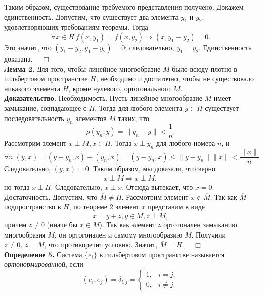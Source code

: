 \documentclass[12pt,a4paper, titlepage]{article}
\begin{document}
Таким образом, существование требуемого представления получено. Докажем единственность. Допустим, что существует два элемента $y_1$ и $y_2$, удовлетворяющих требованиям теоремы. Тогда 
$$
\forall x \in H\ f(x, y_1) = f(x, y_2) \Rightarrow (x, y_1 - y_2) = 0.
$$
Это значит, что $(y_1 - y_2, y_1 - y_2) = 0$; следовательно, $y_1 = y_2$. Единственность доказана. $\quad \Box$\\

\textbf{Лемма 2.} Для того, чтобы линейное многообразие $M$ было всюду плотно в гильбертовом пространстве $H$, необходимо и достаточно, чтобы не существовало никакого элемента $H$, кроме нулевого, ортогонального $M$.\\
\textbf{Доказательство.} Необходимость. Пусть линейное многообразие $M$ имеет замыкание, совпадающее с $H$. Тогда для любого элемента $y \in H$ существует последовательность ${y_n}$ элементов $M$ таких, что 
$$
\rho (y_n, y) = \|y_n - y\| < \frac{1}{n}.
$$
Рассмотрим элемент $x \perp M, x \in H$. Тогда $x \perp y_n$ для любого номера $n$, и
$$
\forall n \; (y, x) = (y - y_n, x) + (y_n, x) = (y - y_n, x) \leqslant \|y - y_n\|\|x\| < \frac{\|x\|}{n}. 
$$
Следовательно, $(y, x) = 0$. Таким образом, мы доказали, что верно 
$$
x \perp M \Rightarrow x \perp \overline{M},
$$
но тогда $x \perp H$. Следовательно, $x \perp x$. Отсюда вытекает, что $x = 0$.\\

Достаточность. Допустим, что $\overline{M} \neq H$. Рассмотрим элемент $x \notin \overline{M}$. Так как $\overline{M}$ --- подпространство в $H$, по теореме 2 элемент $x$ представим в виде
$$
x = y + z, y \in \overline{M}, z \perp \overline{M},
$$
причем $z \neq 0$ (иначе бы $x \in \overline{M}$). Так как элемент $z$ ортогонален замыканию многообразия $M$, он ортогонален и самому многообразию $M$. Получили $z \neq 0, \ z \perp M$, что противоречит условию. Значит, $\overline{M} = H$. $\quad \Box$\\

\textbf{Определение 5.} Система $\{e_i\}$ в гильбертовом пространстве называется \textit{ортонормированной}, если
$$
(e_i, e_j) = \delta_{i,j} =\begin{cases}
1, & i = j, \\
0, & i \neq j.
\end{cases}
$$
\end{document}
